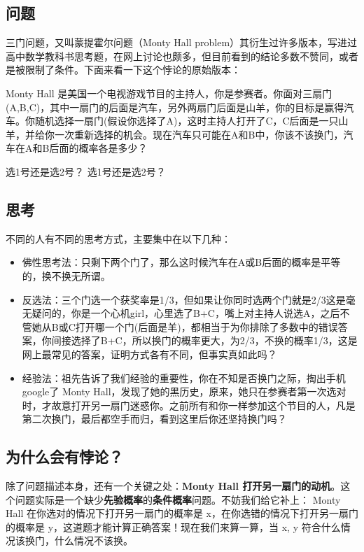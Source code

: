 
\begin{issues}
\issueDraft
\end{issues}

\subsection{问题}
三门问题，又叫蒙提霍尔问题（Monty Hall problem）其衍生过许多版本，写进过高中数学教科书思考题，在网上讨论也颇多，但目前看到的结论多数不赞同，或者是被限制了条件。下面来看一下这个悖论的原始版本：

Monty Hall 是美国一个电视游戏节目的主持人，你是参赛者。你面对三扇门(A,B,C)，其中一扇门的后面是汽车，另外两扇门后面是山羊，你的目标是赢得汽车。你随机选择一扇门(假设你选择了A)，这时主持人打开了C，C后面是一只山羊，并给你一次重新选择的机会。现在汽车只可能在A和B中，你该不该换门，汽车在A和B后面的概率各是多少？

选1号还是选2号？
选1号还是选2号？

\subsection{思考}
不同的人有不同的思考方式，主要集中在以下几种：

\begin{itemize}
\item 佛性思考法：只剩下两个门了，那么这时候汽车在A或B后面的概率是平等的，换不换无所谓。

\item 反选法：三个门选一个获奖率是1/3，但如果让你同时选两个门就是2/3这是毫无疑问的，你是一个心机girl，心里选了B+C，嘴上对主持人说选A，之后不管她从B或C打开哪一个门(后面是羊)，都相当于为你排除了多数中的错误答案，你间接选择了B+C，所以换门的概率更大，为2/3，不换的概率1/3，这是网上最常见的答案，证明方式各有不同，但事实真如此吗？

\item 经验法：祖先告诉了我们经验的重要性，你在不知是否换门之际，掏出手机google了 Monty Hall，发现了她的黑历史，原来，她只在参赛者第一次选对时，才故意打开另一扇门迷惑你。之前所有和你一样参加这个节目的人，凡是第二次换门，最后都空手而归，看到这里后你还坚持换门吗？
\end{itemize}

\subsection{为什么会有悖论？}
除了问题描述本身，还有一个关键之处：\textbf{Monty Hall 打开另一扇门的动机}。这个问题实际是一个缺少\textbf{先验概率}的\textbf{条件概率}问题。不妨我们给它补上： Monty Hall 在你选对的情况下打开另一扇门的概率是 x，在你选错的情况下打开另一扇门的概率是 y，这道题才能计算正确答案！现在我们来算一算，当 x, y 符合什么情况该换门，什么情况不该换。

